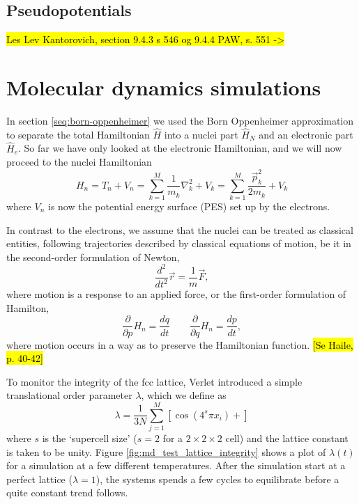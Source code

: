 \documentclass[11pt]{scrbook}   %
\newcommand{\comment}[1]{\hl{#1}}
\begin{document}
\section{Pseudopotentials}

\comment{Les Lev Kantorovich, section 9.4.3 s 546 og 9.4.4 PAW, s. 551 ->}

\chapter{Molecular dynamics simulations}\label{seq:molecular-dynamics}

In section \ref{seq:born-oppenheimer} we used the Born Oppenheimer approximation to separate the total Hamiltonian $\hat{H}$ into a nuclei part $\hat{H}_N$ and an electronic part $\hat{H}_e$. 
So far we have only looked at the electronic Hamiltonian, and we will now proceed to the nuclei Hamiltonian
\begin{equation}
  H_n = T_n + V_n = \sum_{k=1}^M \frac{1}{m_k}\nabla_k^2 + V_k = \sum_{k=1}^M \frac{\vec{p}_k^2}{2m_k} + V_k
  \label{eq:nucleiHamiltonian}
\end{equation}
where $V_n$ is now the potential energy surface (PES) set up by the electrons.

In contrast to the electrons, we assume that the nuclei can be treated as classical entities, following trajectories described by 
classical equations of motion, be it in the
second-order formulation of Newton,
\begin{equation}
  \frac{d^2}{d t^2} \vec{r} = \frac{1}{m}\vec{F},
\end{equation}
where motion is a response to an applied force,
or the first-order formulation of Hamilton,
\begin{equation}
  \frac{\partial}{\partial p} H_n = \frac{dq}{dt} \qquad
  \frac{\partial}{\partial q} H_n = \frac{dp}{dt},
\end{equation}
where motion occurs in a way as to preserve the Hamiltonian function.
\comment{[Se Haile, p. 40-42]}


To monitor the integrity of the fcc lattice, Verlet introduced a simple translational order parameter $\lambda$, which we define as
\begin{equation}
  \lambda = \frac{1}{3N} \sum_{j=1}^M  \left[ \cos\left( 4^s\pi x_i \right) + \right]
\end{equation}
where $s$ is the `supercell size' ($s=2$ for a $2\times 2 \times 2$ cell) and the lattice constant is taken to be unity.
Figure \ref{fig:md_test_lattice_integrity} shows a plot of $\lambda(t)$ for a simulation at a few different temperatures. 
After the simulation start at a perfect lattice ($\lambda=1$), the systems spends a few cycles to equilibrate before a quite constant trend follows.
\end{document}
